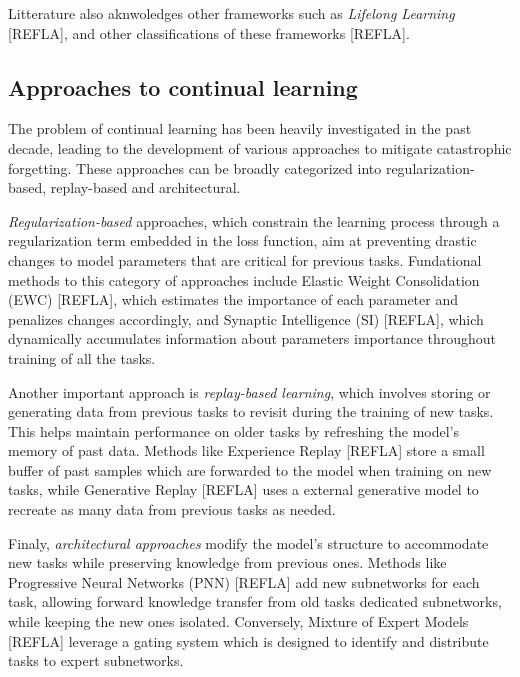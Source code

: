 \documentclass[twocolumn]{article}
\begin{document}
\vspace{2mm}
\noindent
Litterature also aknwoledges other frameworks such as \textit{Lifelong Learning} [REFLA], and other classifications of these frameworks [REFLA].


\subsection{Approaches to continual learning}


The problem of continual learning has been heavily investigated in the past decade, leading to the development of various approaches to mitigate catastrophic forgetting. These approaches can be broadly categorized into regularization-based, replay-based and architectural.

\vspace{2mm}
\noindent
\textit{Regularization-based} approaches, which constrain the learning process through a regularization term embedded in the loss function, aim at preventing drastic changes to model parameters that are critical for previous tasks. Fundational methods to this category of approaches include Elastic Weight Consolidation (EWC) [REFLA], which estimates the importance of each parameter and penalizes changes accordingly, and Synaptic Intelligence (SI) [REFLA], which dynamically accumulates information about parameters importance throughout training of all the tasks.

\vspace{2mm}
\noindent
Another important approach is \textit{replay-based learning}, which involves storing or generating data from previous tasks to revisit during the training of new tasks. This helps maintain performance on older tasks by refreshing the model's memory of past data. Methods like Experience Replay [REFLA] store a small buffer of past samples which are forwarded to the model when training on new tasks, while Generative Replay [REFLA] uses a external generative model to recreate as many data from previous tasks as needed. 

\vspace{2mm}
\noindent
Finaly, \textit{architectural approaches} modify the model's structure to accommodate new tasks while preserving knowledge from previous ones. Methods like Progressive Neural Networks (PNN) [REFLA] add new subnetworks for each task, allowing forward knowledge transfer from old tasks dedicated subnetworks, while keeping the new ones isolated. Conversely, Mixture of Expert Models [REFLA] leverage a gating system which is designed to identify and distribute tasks to expert subnetworks.
\end{document}
